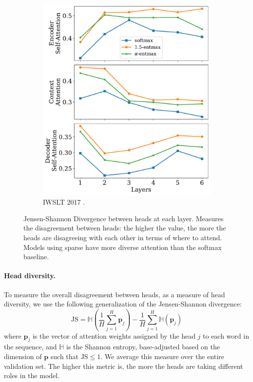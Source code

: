 \begin{figure}[!htbp]
\begin{subfigure}[b]{.49\linewidth}
        \includegraphics[width=\linewidth]{Figures/js_divs_de.pdf}
        \caption{%
            \label{fig:js_divs_de}%
            IWSLT 2017 .}
    \end{subfigure}
    \caption[Jensen-Shannon Divergence between heads at each layer.]{%
        \label{fig:js_divs}
        Jensen-Shannon Divergence between heads at each layer. Measures the
        disagreement between heads: the higher the value, the more the heads
        are disagreeing with each other in terms of where to attend. Models
        using sparse \entmaxtext have more diverse attention than the softmax
        baseline.
    }
\end{figure}

\paragraph*{Head diversity.} To measure the overall disagreement
between heads, as a measure of head diversity, we use the
following generalization of the Jensen-Shannon divergence:
%
\begin{equation}
    \text{JS} = \mathbb H\left(\frac{1}{H}\sum_{j=1}^H \bm{p}_{j}\right) -
    \frac{1}{H}\sum_{j=1}^{H}
    \mathbb H(\bm{p}_j)
\end{equation}
%
where $\bm{p}_j$ is the vector of attention weights assigned by the head
$j$ to each word in the sequence, and $\mathbb H$ is the Shannon entropy,
base-adjusted based on the dimension of $\bm{p}$ such that $\text{JS} \leq
    1$. We average this measure over the entire validation set. The
higher this metric is, the more the heads are taking different roles
in the model.

